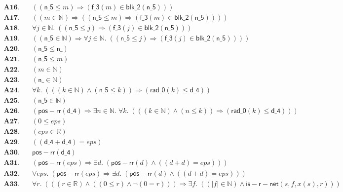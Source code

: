 \documentclass[11pt]{article}
\begin{document}
\begin{align*}
  \mathbf{A16.}\quad & ((\mathsf{n\_5} \leq m) \Rightarrow (\mathsf{f\_3}(m) \in \mathsf{blk\_2}(\mathsf{n\_5}))) \\
  \mathbf{A17.}\quad & ((m \in \mathbb{N}) \Rightarrow ((\mathsf{n\_5} \leq m) \Rightarrow (\mathsf{f\_3}(m) \in \mathsf{blk\_2}(\mathsf{n\_5})))) \\
  \mathbf{A18.}\quad & \forall j \in \mathbb{N}.\; ((\mathsf{n\_5} \leq j) \Rightarrow (\mathsf{f\_3}(j) \in \mathsf{blk\_2}(\mathsf{n\_5}))) \\
  \mathbf{A19.}\quad & ((\mathsf{n\_5} \in \mathbb{N}) \Rightarrow \forall j \in \mathbb{N}.\; ((\mathsf{n\_5} \leq j) \Rightarrow (\mathsf{f\_3}(j) \in \mathsf{blk\_2}(\mathsf{n\_5})))) \\
  \mathbf{A20.}\quad & (\mathsf{n\_5} \leq \mathsf{n\_}) \\
  \mathbf{A21.}\quad & (\mathsf{n\_5} \leq m) \\
  \mathbf{A22.}\quad & (m \in \mathbb{N}) \\
  \mathbf{A23.}\quad & (\mathsf{n\_} \in \mathbb{N}) \\
  \mathbf{A24.}\quad & \forall k.\; (((k \in \mathbb{N}) \wedge (\mathsf{n\_5} \leq k)) \Rightarrow (\mathsf{rad\_0}(k) \leq \mathsf{d\_4})) \\
  \mathbf{A25.}\quad & (\mathsf{n\_5} \in \mathbb{N}) \\
  \mathbf{A26.}\quad & (\mathsf{pos{-}rr}(\mathsf{d\_4}) \Rightarrow \exists n \in \mathbb{N}.\; \forall k.\; (((k \in \mathbb{N}) \wedge (n \leq k)) \Rightarrow (\mathsf{rad\_0}(k) \leq \mathsf{d\_4}))) \\
  \mathbf{A27.}\quad & (0 \leq \mathit{eps}) \\
  \mathbf{A28.}\quad & (\mathit{eps} \in \mathbb{R}) \\
  \mathbf{A29.}\quad & ((\mathsf{d\_4} + \mathsf{d\_4}) = \mathit{eps}) \\
  \mathbf{A30.}\quad & \mathsf{pos{-}rr}(\mathsf{d\_4}) \\
  \mathbf{A31.}\quad & (\mathsf{pos{-}rr}(\mathit{eps}) \Rightarrow \exists d.\; (\mathsf{pos{-}rr}(d) \wedge ((d + d) = \mathit{eps}))) \\
  \mathbf{A32.}\quad & \forall \mathit{eps}.\; (\mathsf{pos{-}rr}(\mathit{eps}) \Rightarrow \exists d.\; (\mathsf{pos{-}rr}(d) \wedge ((d + d) = \mathit{eps}))) \\
  \mathbf{A33.}\quad & \forall r.\; (((r \in \mathbb{R}) \wedge ((0 \leq r) \wedge \neg (0 = r))) \Rightarrow \exists f.\; ((|f| \in \mathbb{N}) \wedge \mathsf{is{-}r{-}net}(s, f, x(s), r))) \\

\end{align*}
\end{document}
